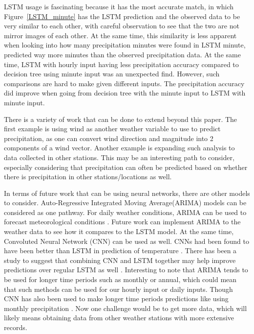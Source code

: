 \documentclass[11pt]{report}
\begin{document}
LSTM usage is fascinating because it has the most accurate match, in which Figure~\ref{LSTM_minute} has the LSTM prediction and the observed data to be very similar to each other, with careful observation to see that the two are not mirror images of each other. At the same time, this similarity is less apparent when looking into how many precipitation minutes were found in LSTM minute, predicted way more minutes than the observed precipitation data. At the same time, LSTM with hourly input having less precipitation accuracy compared to decision tree using minute input was an unexpected find. However, such comparisons are hard to make given different inputs. The precipitation accuracy did improve when going from decision tree with the minute input to LSTM with minute input. 


There is a variety of work that can be done to extend beyond this paper. The first example is using wind as another weather
variable to use to predict precipitation, as one can convert wind
direction and magnitude into 2 components of a wind vector. Another example is
expanding such analysis to data collected in other stations. This may be an
interesting path to consider, especially considering that precipitation
can often be predicted based on whether there is precipitation in other
stations/locations as well. 

In terms of future work that can be using neural networks, there are other models to consider. 
Auto-Regressive Integrated Moving Average(ARIMA) models can be considered as one pathway. 
For daily weather conditions, ARIMA can be used to forecast meteorological conditions \cite[]{ARIMA}. 
Future work can implement ARIMA to the weather data to see how it compares to the LSTM model. 
At the same time, Convoluted Neural Network (CNN) can be used as well. CNNs had been found to 
have been better than LSTM in prediction of temperature \cite[]{CNN}. There has been a study to
suggest that combining CNN and LSTM together may help improve predictions over regular LSTM as 
well \cite[]{shi2015convolutional}. Interesting to note that ARIMA tends to be used for longer 
time periods such as monthly or annual, which could mean that such methods can be used for our 
hourly input or daily inputs. Though CNN has also been used to make longer time periods 
predictions like using monthly precipitation \cite[]{Month_CNN}. Now one challenge would be to 
get more data, which will likely means obtaining data from other weather stations with more extensive records. 
\end{document}
